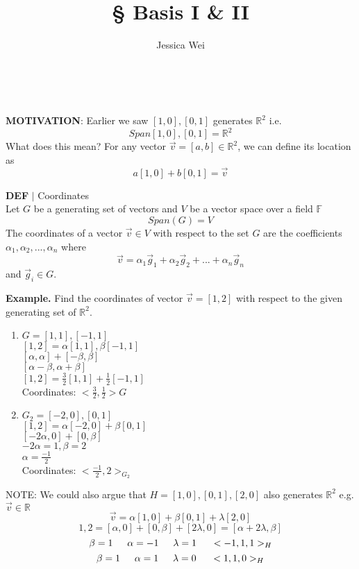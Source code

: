 \documentclass [12pt]{article}
\begin{document}
\begin{center}\title*{\Large \S {} Basis I \& II}\\\author*{Jessica Wei} \end{center}
\normalsize
\noindent\textbf{MOTIVATION}: Earlier we saw ${[1,0],[0,1]}$ generates $\mathbb{R}^2$ i.e.
\[Span{[1,0],[0,1]}=\mathbb{R}^2\]
What does this mean? For any vector $\overrightarrow{v}=[a,b]\in\mathbb{R}^2$, we can define its location as 
\[a[1,0]+b[0,1]=\overrightarrow{v}\]
\begin{framed}
\noindent\textbf{DEF} $|$ Coordinates\\
Let $G$ be a generating set of vectors and $V$ be a vector space over a field $\mathbb{F}$
\[Span(G)=V\]
The coordinates of a vector $\overrightarrow{v}\in V$ with respect to the set $G$ are the coefficients $\alpha_1,\alpha_2,...,\alpha_n$ where 
\[\overrightarrow{v}=\alpha_1\overrightarrow{g}_1+\alpha_2\overrightarrow{g}_2+...+\alpha_n\overrightarrow{g}_n\]
and $\overrightarrow{g}_i\in G$.
\end{framed} 
\noindent\textbf{Example. }Find the coordinates of vector $\overrightarrow{v}=[1,2]$ with respect to the given generating set of $\mathbb{R}^2$.
\begin{enumerate}[\quad(a)]
    \item $G={[1,1],[-1,1]}$\\
    $[1,2]=\alpha[1,1],\beta[-1,1]$\\
    $[\alpha,\alpha]+[-\beta,\beta]$\\
    $[\alpha-\beta,\alpha+\beta]$\\
    $[1,2]=\frac{3}{2}[1,1]+\frac{1}{2}[-1,1]$\\
    Coordinates: $<\frac{3}{2},\frac{1}{2}>G$
    \item $G_2={[-2,0],[0,1]}$\\
    $[1,2]=\alpha[-2,0]+\beta[0,1]$\\
    $[-2\alpha,0]+[0,\beta]$\\
    $-2\alpha = 1, \beta=2$\\
    $\alpha = \frac{-1}{2}$\\
    Coordinates: $<\frac{-1}{2}, 2>_{G_2}$
\end{enumerate}
NOTE: We could also argue that $H={[1,0],[0,1],[2,0]}$ also generates $\mathbb{R}^2$ e.g. $\overrightarrow{v}\in\mathbb{R}$
\[\overrightarrow{v}=\alpha[1,0]+\beta[0,1]+\lambda[2,0]\]
\[1,2=[\alpha,0]+[0,\beta]+[2\lambda,0] = [\alpha+2\lambda,\beta]\]
\[\beta=1\indent\alpha=-1\indent\lambda=1\indent<-1,1,1>_H\]
\[\beta=1\indent\alpha=1\indent\lambda=0\indent<1,1,0>_H\]
\end{document}
